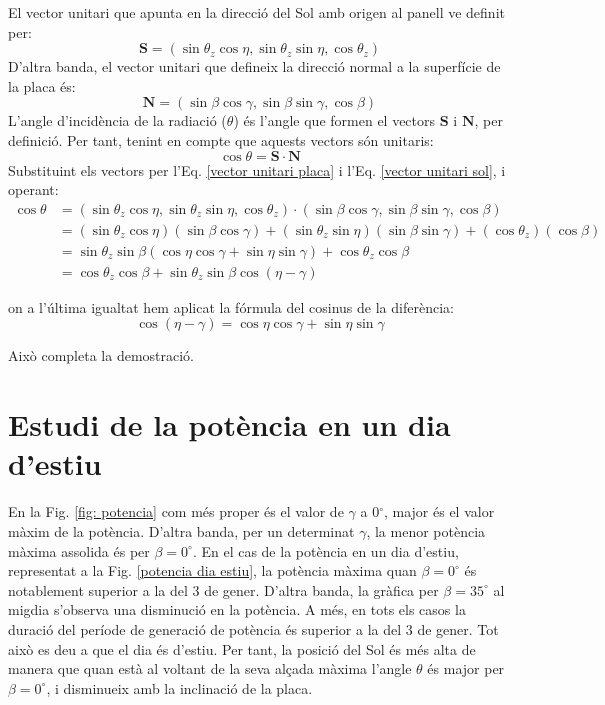\documentclass[11pt]{article}
\begin{document}
El vector unitari que apunta en la direcció del Sol amb origen al panell ve definit per:
\begin{equation}
    \mathbf{S} = (\sin \theta_z \cos \eta, \sin \theta_z \sin \eta, \cos \theta_z)
    \label{vector unitari sol}
\end{equation}
D'altra banda, el vector unitari que defineix la direcció normal a la superfície de la placa és:
\begin{equation}
       \mathbf{N} = (\sin \beta \cos \gamma, \sin \beta \sin \gamma, \cos \beta)
       \label{vector unitari placa}
\end{equation}
L'angle d'incidència de la radiació (\(\theta\)) és l'angle que formen el vectors \(\mathbf{S}\) i \(\mathbf{N}\), per definició. Per tant, tenint en compte que aquests vectors són unitaris:
\begin{equation}
    \cos \theta = \mathbf{S} \cdot \mathbf{N}
\end{equation}
Substituint els vectors per l'Eq. \eqref{vector unitari placa} i l'Eq. \eqref{vector unitari sol}, i operant:
\begin{align*}
    \cos \theta &= (\sin \theta_z \cos \eta, \sin \theta_z \sin \eta, \cos \theta_z) \cdot (\sin \beta \cos \gamma, \sin \beta \sin \gamma, \cos \beta) \\
    &= (\sin \theta_z \cos \eta)(\sin \beta \cos \gamma) + (\sin \theta_z \sin \eta)(\sin \beta \sin \gamma) + (\cos \theta_z)(\cos \beta) \\
    &= \sin \theta_z \sin \beta (\cos \eta \cos \gamma + \sin \eta \sin \gamma) + \cos \theta_z \cos \beta \\
    &= \cos \theta_z \cos \beta + \sin \theta_z \sin \beta \cos (\eta - \gamma)
\end{align*}

on a l'última igualtat hem aplicat la fórmula del cosinus de la diferència:
\[
\cos (\eta - \gamma) = \cos \eta \cos \gamma + \sin \eta \sin \gamma
\]

Això completa la demostració.


\section{Estudi de la potència en un dia d'estiu}
\label{sec: dia estiu potencia}

En la Fig. \ref{fig: potencia} com més proper és el valor de $\gamma$ a 0$^{\circ}$, major és el valor màxim de la potència. D'altra banda, per un determinat $\gamma$, la menor potència màxima assolida és per $\beta=0^{\circ}$. En el cas de la potència en un dia d'estiu, representat a la Fig. \ref{potencia dia estiu}, la potència màxima quan $\beta=0^{\circ}$ és notablement superior a la del 3 de gener. D'altra banda, la gràfica per $\beta=35^{\circ}$ al migdia s'observa una disminució en la potència. A més, en tots els casos la duració del període de generació de potència és superior a la del 3 de gener. Tot això es deu a que el dia és d'estiu. Per tant, la posició del Sol és més alta de manera que quan està al voltant de la seva alçada màxima l’angle $\theta$ és major per $\beta=0^{\circ}$, i disminueix amb la inclinació de la placa.
\end{document}
